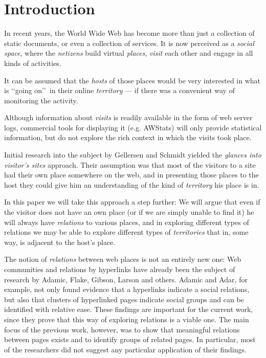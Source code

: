 \documentclass[a4paper]{danarticle}
\theoremstyle{remark}
\begin{document}
  \section{Introduction}
    In recent years, the World Wide Web has become more than just a collection
    of static documents, or even a collection of services. It is now perceived
    as a \textit{social space}, where the \textit{netizens} build virtual
    \textit{places}, \textit{visit} each other and engage in all kinds of
    activities.
    
    It can be assumed that the \textit{hosts} of those places would be
    very interested in what is \lq\lq going on\rq\rq\ in their online
    \textit{territory} --- if
    there was a convenient way of monitoring the activity. 
    
    Although
    information about \textit{visits} is readily available in the
    form of web server logs, commercial tools for displaying it (e.g. 
    AWStats\cite{awstats}) will only
    provide statistical information, but do not explore the rich context in which
    the visits took place. 
    
    Initial research into the subject by Gellersen and Schmidt\cite{webaware}
    yielded the
    \textit{glances into visitor's sites} approach. Their assumption was 
    that most of
    the visitors to a site had their own place somewhere on the web, and in
    presenting those places to the host they could give him an understanding of the
    kind of \textit{territory} his place is in.
    
    In this paper we will take this approach a step further: We will argue that
    even if the visitor does not have an own place (or if we are
    simply unable to find it) he will always have \textit{relations} to various
    places, and in exploring different types of relations we may be able to
    explore different types of \textit{territories} that in, some way, is adjacent to
    the host's place.
    
    The notion of \emph{relations} between web places is not an entirely new 
    one: Web communities and relations by hyperlinks have already 
    been the subject of research by Adamic\cite{links},
    Flake\cite{flake}, Gibson\cite{gibson}, 
    Larson\cite{larson} and others. 
    Adamic and Adar, for example, not only found 
    evidence that a hyperlinks indicate a social relations, but also that 
    clusters of hyperlinked pages indicate social groups and can be identified 
    with relative ease\cite{links}. These findings are important for the current work, 
    since they prove that this way of exploring relations is a viable one. The main
    focus of the previous work, however, was to show that meaningful relations 
    between pages exists and to identify groups of related pages. In particular,
    most of the researchers did not suggest any particular application of their
    findings.
    
\end{document}
